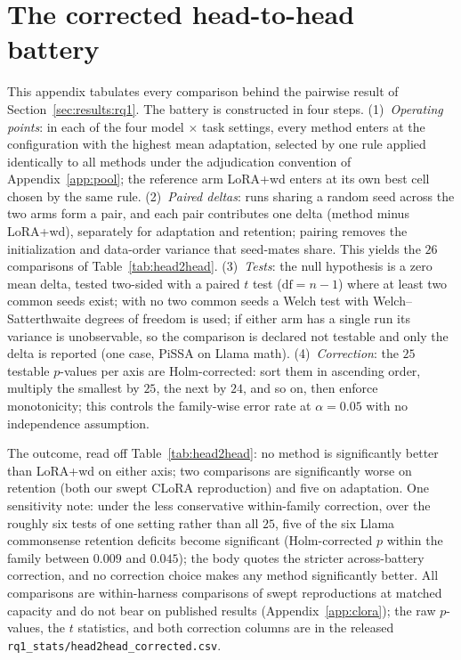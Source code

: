 \documentclass[11pt]{article}
\begin{document}
\section{The corrected head-to-head battery}\label{app:head2head}
This appendix tabulates every comparison behind the pairwise result of
Section~\ref{sec:results:rq1}. The battery is constructed in four steps.
(1)~\emph{Operating points}: in each of the four model $\times$ task
settings, every method enters at the configuration with the highest mean
adaptation, selected by one rule applied identically to all methods under
the adjudication convention of Appendix~\ref{app:pool}; the reference
arm LoRA{+}wd enters at its own best cell chosen by the same rule.
(2)~\emph{Paired deltas}: runs sharing a random seed across the two arms
form a pair, and each pair contributes one delta (method minus LoRA{+}wd),
separately for adaptation and retention; pairing removes the
initialization and data-order variance that seed-mates share. This yields
the $26$ comparisons of Table~\ref{tab:head2head}. (3)~\emph{Tests}: the
null hypothesis is a zero mean delta, tested two-sided with a paired $t$
test ($\mathrm{df}=n-1$) where at least two common seeds exist; with no
two common seeds a Welch test with Welch--Satterthwaite degrees of freedom
is used; if either arm has a single run its variance is unobservable, so
the comparison is declared not testable and only the delta is reported
(one case, PiSSA on Llama math). (4)~\emph{Correction}: the $25$ testable
$p$-values per axis are Holm-corrected: sort them in ascending order,
multiply the smallest by $25$, the next by $24$, and so on, then enforce
monotonicity; this controls the family-wise error rate at $\alpha=0.05$
with no independence assumption.

The outcome, read off Table~\ref{tab:head2head}: no method is
significantly better than LoRA{+}wd on either axis; two comparisons are
significantly worse on retention (both our swept CLoRA reproduction) and
five on adaptation. One sensitivity note: under the less conservative
within-family correction, over the roughly six tests of one setting
rather than all $25$, five of the six Llama commonsense retention
deficits become significant (Holm-corrected $p$ within the family between
$0.009$ and $0.045$); the body quotes the stricter across-battery
correction, and no correction choice makes any method significantly
better. All comparisons are within-harness comparisons of swept
reproductions at matched capacity and do not bear on published results
(Appendix~\ref{app:clora}); the raw $p$-values, the $t$ statistics, and
both correction columns are in the released
\texttt{rq1\_stats/head2head\_corrected.csv}.
\end{document}
